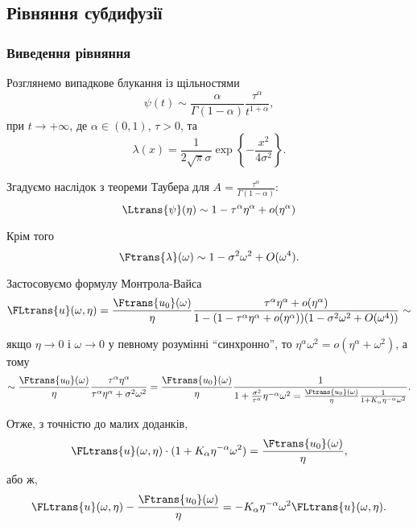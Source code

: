 \subsection{Рівняння субдифузії}

\subsubsection{Виведення рівняння}

Розглянемо випадкове блукання із щільностями
\begin{equation}
    \psi(t) \sim \frac{\alpha}{\Gamma(1 - \alpha)} \frac{\tau^\alpha}{t^{1 + \alpha}},
\end{equation}
при $t \to + \infty$, де $\alpha \in (0, 1)$, $\tau > 0$, та
\begin{equation}
    \lambda(x) = \frac{1}{2 \sqrt{\pi} \sigma} \exp\left\{-\frac{x^2}{4 \sigma^2}\right\}.
\end{equation}

Згадуємо наслідок з теореми Таубера для $A = \frac{\tau^\alpha}{\Gamma(1 - \alpha)}$:
\begin{equation}
    \Ltrans{\psi}(\eta) \sim 1 - \tau^\alpha \eta^\alpha + o(\eta^\alpha)
\end{equation}

Крім того
\begin{equation}
    \Ftrans{\lambda}(\omega) \sim 1 - \sigma^2 \omega^2 + O(\omega^4).
\end{equation}

Застосовуємо формулу Монтрола-Вайса
\begin{equation}
    \FLtrans{u}(\omega, \eta) = \frac{\Ftrans{u_0}(\omega)}{\eta} \frac{\tau^\alpha \eta^\alpha + o(\eta^\alpha)}{1 - (1 - \tau^\alpha \eta^\alpha + o(\eta^\alpha)) (1 - \sigma^2 \omega^2 + O(\omega^4))} \sim
\end{equation}

якщо $\eta \to 0$ і $\omega \to 0$ у певному розумінні ``синхронно'', то $\eta^\alpha \omega^2 = o(\eta^\alpha + \omega^2)$, а тому
\begin{equation}
    \sim \frac{\Ftrans{u_0}(\omega)}{\eta} \frac{\tau^\alpha \eta^\alpha}{\tau^\alpha \eta^\alpha + \sigma^2 \omega^2} = \frac{\Ftrans{u_0}(\omega)}{\eta} \frac{1}{1 + \frac{\sigma^2}{\tau^\alpha} \eta^{-\alpha} \omega^2 = \frac{\Ftrans{u_0}(\omega)}{\eta} \frac{1}{1 + K_\alpha \eta^{-\alpha} \omega^2}}.
\end{equation}

Отже, з точністю до малих доданків,
\begin{equation}
    \FLtrans{u}(\omega, \eta) \cdot (1 + K_\alpha \eta^{-\alpha} \omega^2) = \frac{\Ftrans{u_0}(\omega)}{\eta},
\end{equation}
або ж,
\begin{equation}
    \FLtrans{u}(\omega, \eta) - \frac{\Ftrans{u_0}(\omega)}{\eta} = - K_\alpha \eta^{-\alpha} \omega^2 \FLtrans{u}(\omega, \eta).
\end{equation}

